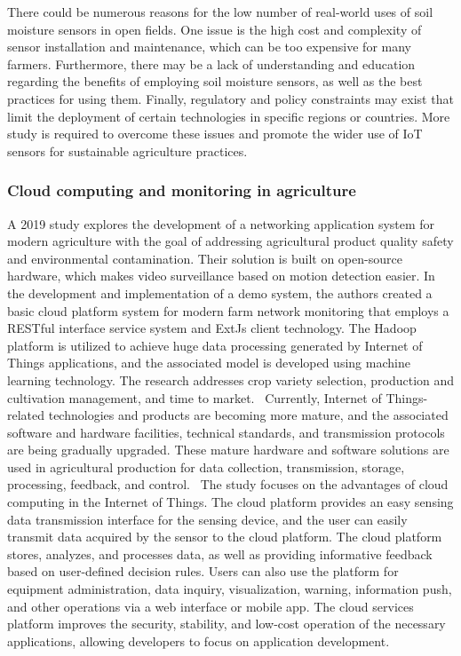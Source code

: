 \documentclass[11pt]{scrartcl} %
\begin{document}
\newline There could be numerous reasons for the low number of real-world uses of soil moisture sensors in open fields. One issue is the high cost and complexity of sensor installation and maintenance, which can be too expensive for many farmers. Furthermore, there may be a lack of understanding and education regarding the benefits of employing soil moisture sensors, as well as the best practices for using them. Finally, regulatory and policy constraints may exist that limit the deployment of certain technologies in specific regions or countries. More study is required to overcome these issues and promote the wider use of IoT sensors for sustainable agriculture practices.

\subsubsection{Cloud computing and monitoring in agriculture}
A 2019 study explores the development of a networking application system for modern agriculture with the goal of addressing agricultural product quality safety and environmental contamination. Their solution is built on open-source hardware, which makes video surveillance based on motion detection easier. In the development and implementation of a demo system, the authors created a basic cloud platform system for modern farm network monitoring that employs a RESTful interface service system and ExtJs client technology. The Hadoop platform is utilized to achieve huge data processing generated by Internet of Things applications, and the associated model is developed using machine learning technology. The research addresses crop variety selection, production and cultivation management, and time to market.~\parencite{cloud_computing_and_monitoring}
\newline Currently, Internet of Things-related technologies and products are becoming more mature, and the associated software and hardware facilities, technical standards, and transmission protocols are being gradually upgraded. These mature hardware and software solutions are used in agricultural production for data collection, transmission, storage, processing, feedback, and control.~\parencite{cloud_computing_and_monitoring}
\newline The study focuses on the advantages of cloud computing in the Internet of Things. The cloud platform provides an easy sensing data transmission interface for the sensing device, and the user can easily transmit data acquired by the sensor to the cloud platform. The cloud platform stores, analyzes, and processes data, as well as providing informative feedback based on user-defined decision rules. Users can also use the platform for equipment administration, data inquiry, visualization, warning, information push, and other operations via a web interface or mobile app. The cloud services platform improves the security, stability, and low-cost operation of the necessary applications, allowing developers to focus on application development.~\parencite{cloud_computing_and_monitoring}
\end{document}
